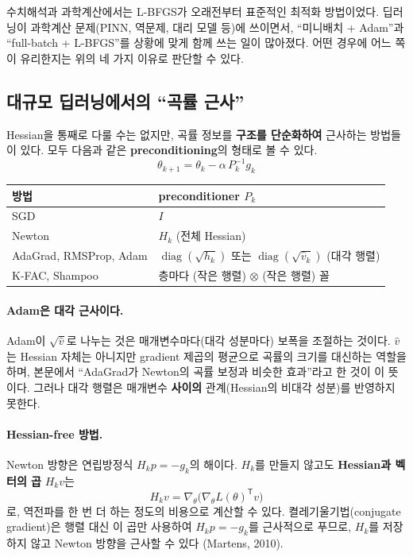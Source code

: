 \documentclass[11pt,a4paper]{article}
\newcommand{\T}{^{\mathsf T}}
\begin{document}
\begin{thinkbox}
수치해석과 과학계산에서는 L-BFGS가 오래전부터 표준적인 최적화 방법이었다.
딥러닝이 과학계산 문제(PINN, 역문제, 대리 모델 등)에 쓰이면서,
``미니배치 + Adam''과 ``full-batch + L-BFGS''를 상황에 맞게 함께 쓰는 일이 많아졌다.
어떤 경우에 어느 쪽이 유리한지는 위의 네 가지 이유로 판단할 수 있다.
\end{thinkbox}

\subsection{대규모 딥러닝에서의 ``곡률 근사''}\label{app:largescale}

Hessian을 통째로 다룰 수는 없지만, 곡률 정보를 \textbf{구조를 단순화하여} 근사하는 방법들이 있다.
모두 다음과 같은 \textbf{preconditioning}의 형태로 볼 수 있다.
\[
\boxed{
\theta_{k+1}=\theta_k-\alpha\,P_k^{-1}g_k
}
\]
\begin{center}
\begin{tabular}{@{}ll@{}}
\toprule
방법 & preconditioner $P_k$ \\
\midrule
SGD & $I$ \\
Newton & $H_k$ (전체 Hessian) \\
AdaGrad, RMSProp, Adam & $\operatorname{diag}(\sqrt{h_k})$ 또는 $\operatorname{diag}(\sqrt{\hat v_k})$ (대각 행렬) \\
K-FAC, Shampoo & 층마다 (작은 행렬) $\otimes$ (작은 행렬) 꼴 \\
\bottomrule
\end{tabular}
\end{center}

\paragraph{Adam은 대각 근사이다.}
Adam이 $\sqrt{\hat v}$로 나누는 것은 매개변수마다(대각 성분마다) 보폭을 조절하는 것이다.
$\hat v$는 Hessian 자체는 아니지만 gradient 제곱의 평균으로 곡률의 크기를 대신하는 역할을 하며,
본문에서 ``AdaGrad가 Newton의 곡률 보정과 비슷한 효과''라고 한 것이 이 뜻이다.
그러나 대각 행렬은 매개변수 \textbf{사이의} 관계(Hessian의 비대각 성분)를 반영하지 못한다.

\paragraph{Hessian-free 방법.}
Newton 방향은 연립방정식 $H_kp=-g_k$의 해이다.
$H_k$를 만들지 않고도 \textbf{Hessian과 벡터의 곱} $H_kv$는
\[
H_kv=\nabla_\theta\bigl(\nabla_\theta L(\theta)\T v\bigr)
\]
로, 역전파를 한 번 더 하는 정도의 비용으로 계산할 수 있다.
켤레기울기법(conjugate gradient)은 행렬 대신 이 곱만 사용하여 $H_kp=-g_k$를 근사적으로 푸므로,
$H_k$를 저장하지 않고 Newton 방향을 근사할 수 있다 (Martens, 2010).
\end{document}
